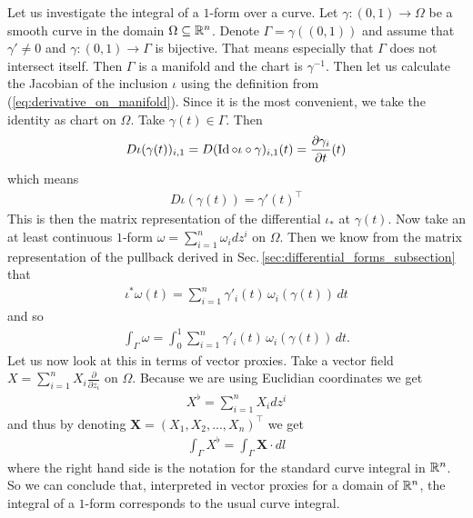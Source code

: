 \documentclass[../main.tex]{subfiles}
\begin{document}
\begin{example}\label{ex:integration_1_forms}
    Let us investigate the integral of a $1$-form over a curve. 
    Let $\gamma: (0,1) \rightarrow \Omega$ be a smooth curve in the domain $\Omega 
    \subseteq \mathbb{R}^n$. Denote $\Gamma = \gamma((0,1))$ and assume that 
    $\gamma' \neq 0$ and $\gamma: (0,1) \rightarrow \Gamma$ is bijective.
    That means especially that $\Gamma$ does not intersect itself.
    Then $\Gamma$ is a manifold and the chart is $\gamma^{-1}$.
    Then let us calculate the Jacobian of the inclusion $\iota$ using the 
    definition from (\ref{eq:derivative_on_manifold}). 
    Since it is the most convenient, we take the 
    identity as chart on $\Omega$. Take $\gamma(t) \in \Gamma$. Then
    \begin{align*}
        D\iota(\gamma(t))_{i,1} = D(\operatorname{Id} \circ \iota \circ \gamma)_{i,1}(t)
        = \frac{\partial \gamma_i}{\partial t}(t)
    \end{align*} 
    which means
    \begin{align*}
        D\iota(\gamma(t)) = \gamma'(t)^\top
    \end{align*}
    This is then the matrix representation of the differential $\iota_*$ at 
    $\gamma(t)$.
    Now take an at least continuous $1$-form $\omega = \sum_{i=1}^n \omega_i dz^i$ 
    on $\Omega$. Then we know from the matrix representation of the 
    pullback derived in Sec.\,\ref{sec:differential_forms_subsection} that 
    \begin{align*}
        \iota^*\omega (t) = \sum_{i=1}^n \gamma'_i(t) \, \omega_i(\gamma(t)) \,dt
    \end{align*}
    and so
    \begin{align*}
        \int_\Gamma \omega = \int_0^1\sum_{i=1}^n \gamma'_i(t) \, \omega_i(\gamma(t)) \,dt.
    \end{align*}
    Let us now look at this in terms of vector proxies. Take a vector field 
    $X = \sum_{i=1}^n X_i \frac{\partial}{\partial z_i}$ on $\Omega$.
    Because we are using Euclidian coordinates we get
    \begin{align*}
        X^\flat = \sum_{i=1}^n X_i dz^i
    \end{align*}
    and thus by denoting $\mathbf{X} = (X_1, X_2, ..., X_n)^\top$ we get
    \begin{align*}
        \int_\Gamma X^\flat = \int_\Gamma \mathbf{X}\cdot dl
    \end{align*}
    where the right hand side is the notation for the standard curve integral 
    in $\mathbb{R}^n$. So we can conclude that, interpreted in vector proxies for 
    a domain of $\mathbb{R}^n$, the integral of a $1$-form corresponds to the usual 
    curve integral.
\end{example}
\end{document}
